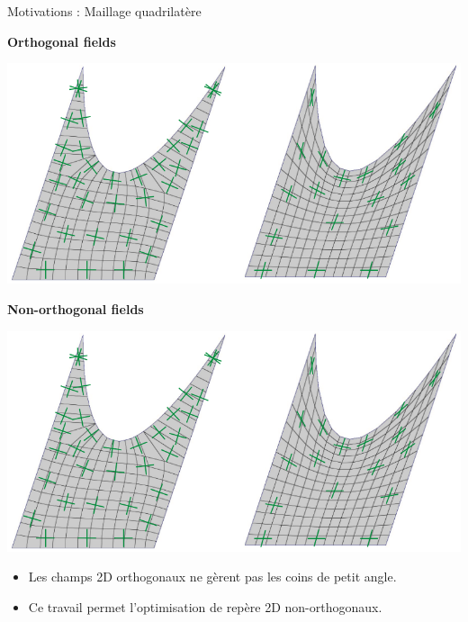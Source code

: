 \begin{frame}{Motivations : Maillage quadrilatère}
    \centering
    
    \begin{minipage}[c]{0.48\textwidth}
    \centering 
    \textbf{Orthogonal fields}\\
    \vspace{0.3cm}
    \begin{adjustbox}{width=0.8\linewidth,clip,trim=0 0 {.48\width} 0}
        \includegraphics{img_spm_ff/comp1.png}
    \end{adjustbox}
    \end{minipage}%
    \hfill\vline\hfill
    \begin{minipage}[c]{0.48\textwidth}
    \centering 
    \textbf{Non-orthogonal fields}\\
    \vspace{0.3cm}
    \begin{adjustbox}{width=0.75\linewidth,clip,trim={.52\width} 0 0 0}
        \includegraphics{img_spm_ff/comp1.png}
    \end{adjustbox}
    \end{minipage}
    
    \vspace*{0.3cm}
    \begin{itemize}
         \item Les champs 2D orthogonaux ne gèrent pas les coins de petit angle.
         \item Ce travail permet l'optimisation de repère 2D non-orthogonaux.
    \end{itemize}
    
\end{frame}

